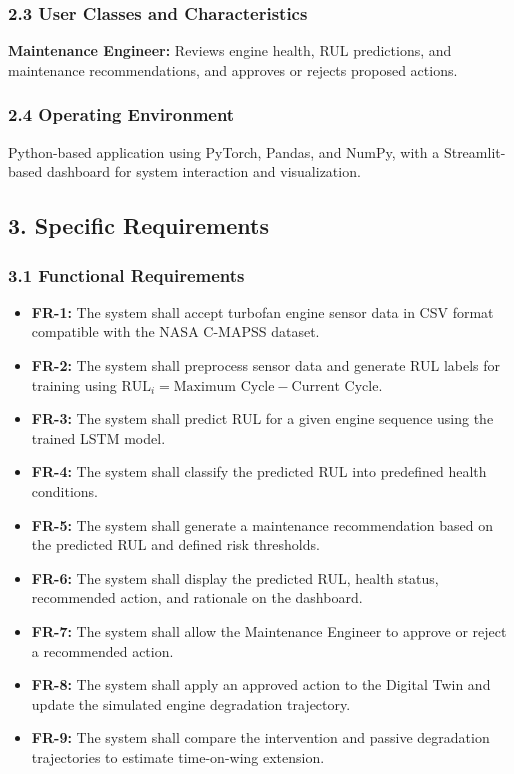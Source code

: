 \documentclass[12pt,a4paper]{report}
\begin{document}
\subsubsection*{2.3 User Classes and Characteristics}
\textbf{Maintenance Engineer:} Reviews engine health, RUL predictions, and maintenance recommendations, and approves or rejects proposed actions.

\subsubsection*{2.4 Operating Environment}
Python-based application using PyTorch, Pandas, and NumPy, with a Streamlit-based dashboard for system interaction and visualization.

\subsection*{3. Specific Requirements}

\subsubsection*{3.1 Functional Requirements}
\begin{itemize}
    \item \textbf{FR-1:} The system shall accept turbofan engine sensor data in CSV format compatible with the NASA C-MAPSS dataset.
    \item \textbf{FR-2:} The system shall preprocess sensor data and generate RUL labels for training using $\text{RUL}_i = \text{Maximum Cycle} - \text{Current Cycle}$.
    \item \textbf{FR-3:} The system shall predict RUL for a given engine sequence using the trained LSTM model.
    \item \textbf{FR-4:} The system shall classify the predicted RUL into predefined health conditions.
    \item \textbf{FR-5:} The system shall generate a maintenance recommendation based on the predicted RUL and defined risk thresholds.
    \item \textbf{FR-6:} The system shall display the predicted RUL, health status, recommended action, and rationale on the dashboard.
    \item \textbf{FR-7:} The system shall allow the Maintenance Engineer to approve or reject a recommended action.
    \item \textbf{FR-8:} The system shall apply an approved action to the Digital Twin and update the simulated engine degradation trajectory.
    \item \textbf{FR-9:} The system shall compare the intervention and passive degradation trajectories to estimate time-on-wing extension.
\end{itemize}
\end{document}
